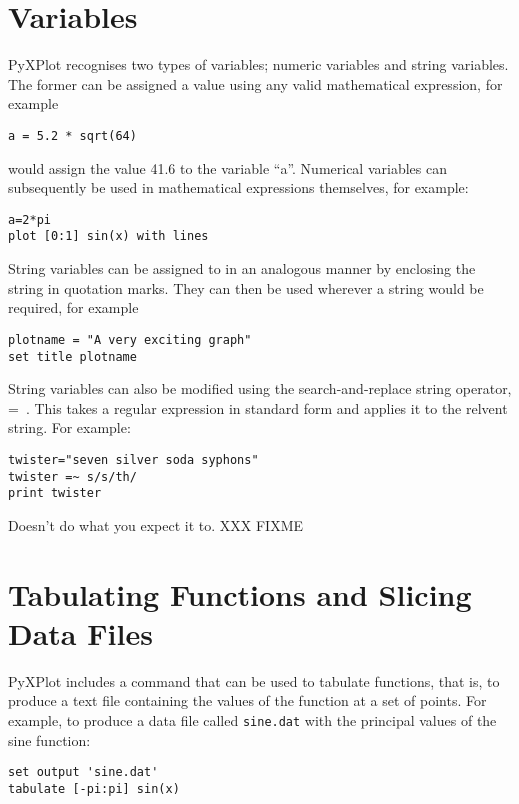 \section{Variables}

PyXPlot recognises two types of variables; numeric variables and string
variables.  The former can be assigned a value using any valid mathematical
expression, for example

\begin{verbatim}
a = 5.2 * sqrt(64)
\end{verbatim}

would assign the value 41.6 to the variable ``a''.  Numerical variables can
subsequently be used in mathematical expressions themselves, for example:

\begin{verbatim}
a=2*pi
plot [0:1] sin(x) with lines
\end{verbatim}

String variables can be assigned to in an analogous manner by enclosing the
string in quotation marks.  They can then be used wherever a string would be
required, for example

\begin{verbatim}
plotname = "A very exciting graph"
set title plotname
\end{verbatim}

String variables can also be modified using the search-and-replace string
operator, =~.  This takes a regular expression in standard form and applies it
to the relvent string.  For example:

\begin{verbatim}
twister="seven silver soda syphons"
twister =~ s/s/th/
print twister
\end{verbatim}

Doesn't do what you expect it to. XXX FIXME

\section{Tabulating Functions and Slicing Data Files}

PyXPlot includes a command that can be used to tabulate functions, that is, to
produce a text file containing the values of the function at a set of points.
For example, to produce a data file called {\tt sine.dat} with the principal
values of the sine function:

\begin{verbatim}
set output 'sine.dat'
tabulate [-pi:pi] sin(x)
\end{verbatim}

